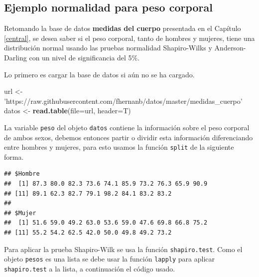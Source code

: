 \documentclass[10pt,]{krantz}
\makeatletter
\newenvironment{Shaded}{\begin{snugshade}}{\end{snugshade}}
\newcommand{\KeywordTok}[1]{\textcolor[rgb]{0.13,0.29,0.53}{\textbf{#1}}}
\newcommand{\DataTypeTok}[1]{\textcolor[rgb]{0.13,0.29,0.53}{#1}}
\newcommand{\StringTok}[1]{\textcolor[rgb]{0.31,0.60,0.02}{#1}}
\newcommand{\OperatorTok}[1]{\textcolor[rgb]{0.81,0.36,0.00}{\textbf{#1}}}
\newcommand{\NormalTok}[1]{#1}
\newenvironment{kframe}{%
\medskip{}
\setlength{\fboxsep}{.8em}
 \def\at@end@of@kframe{}%
 \ifinner\ifhmode%
  \def\at@end@of@kframe{\end{minipage}}%
  \begin{minipage}{\columnwidth}%
 \fi\fi%
 \def\FrameCommand##1{\hskip\@totalleftmargin \hskip-\fboxsep
 \colorbox{shadecolor}{##1}\hskip-\fboxsep
     \hskip-\linewidth \hskip-\@totalleftmargin \hskip\columnwidth}%
 \MakeFramed {\advance\hsize-\width
   \@totalleftmargin\z@ \linewidth\hsize
   \@setminipage}}%
 {\par\unskip\endMakeFramed%
 \at@end@of@kframe}
\renewenvironment{Shaded}{\begin{kframe}}{\end{kframe}}
\makeatother
\begin{document}
\subsection*{Ejemplo normalidad para peso
corporal}\label{ejemplo-normalidad-para-peso-corporal}


Retomando la base de datos \textbf{medidas del cuerpo} presentada en el
Capítulo \ref{central}, se desea saber si el peso corporal, tanto de
hombres y mujeres, tiene una distribución normal usando las pruebas
normalidad Shapiro-Wilks y Anderson-Darling con un nivel de
significancia del 5\%.

Lo primero es cargar la base de datos si aún no se ha cargado.

\begin{Shaded}
\begin{Highlighting}[]
\NormalTok{url <-}\StringTok{ 'https://raw.githubusercontent.com/fhernanb/datos/master/medidas_cuerpo'}
\NormalTok{datos <-}\StringTok{ }\KeywordTok{read.table}\NormalTok{(}\DataTypeTok{file=}\NormalTok{url, }\DataTypeTok{header=}\NormalTok{T)}
\end{Highlighting}
\end{Shaded}

La variable \texttt{peso} del objeto \texttt{datos} contiene la
información sobre el peso corporal de ambos sexos, debemos entonces
partir o dividir esta información diferenciando entre hombres y mujeres,
para esto usamos la función \texttt{split} de la siguiente forma.

\begin{Shaded}
\end{Shaded}

\begin{verbatim}
## $Hombre
##  [1] 87.3 80.0 82.3 73.6 74.1 85.9 73.2 76.3 65.9 90.9
## [11] 89.1 62.3 82.7 79.1 98.2 84.1 83.2 83.2
## 
## $Mujer
##  [1] 51.6 59.0 49.2 63.0 53.6 59.0 47.6 69.8 66.8 75.2
## [11] 55.2 54.2 62.5 42.0 50.0 49.8 49.2 73.2
\end{verbatim}

Para aplicar la prueba Shapiro-Wilk se usa la función
\texttt{shapiro.test}. Como el objeto \texttt{pesos} es una lista se
debe usar la función \texttt{lapply} para aplicar \texttt{shapiro.test}
a la lista, a continuación el código usado.
\end{document}
